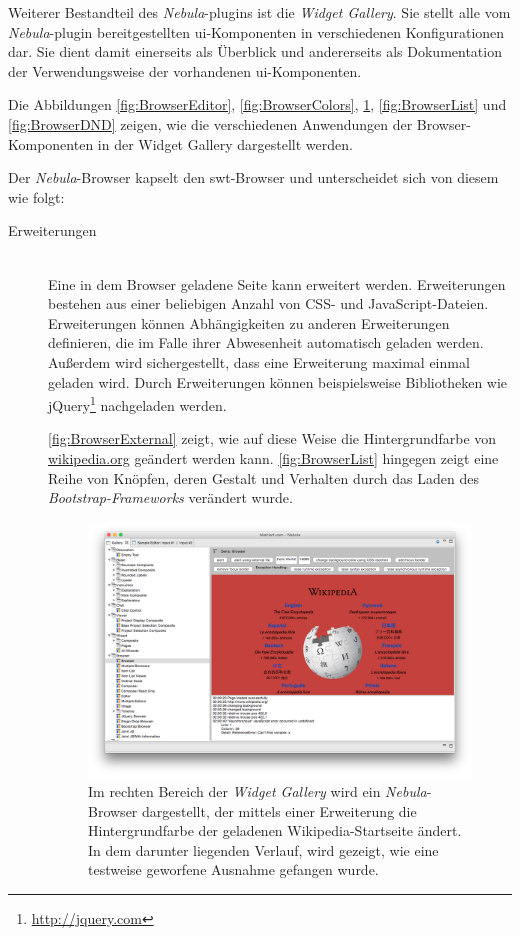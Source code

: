 Weiterer Bestandteil des \textit{Nebula}-\gls{plugin}s ist die \textit{Widget Gallery}. Sie stellt alle vom \textit{Nebula}-\gls{plugin} bereitgestellten \acrshort{ui}-Komponenten in verschiedenen Konfigurationen dar. Sie dient damit einerseits als Überblick und andererseits als Dokumentation der Verwendungsweise der vorhandenen \acrshort{ui}-Komponenten.

Die Abbildungen \ref{fig:BrowserEditor}, \ref{fig:BrowserColors}, \ref{fig:BrowserExternal}, \ref{fig:BrowserList} und \ref{fig:BrowserDND} zeigen, wie die verschiedenen Anwendungen der Browser-Komponenten in der Widget Gallery dargestellt werden.

Der \textit{Nebula}-Browser kapselt den \gls{swt}-Browser und unterscheidet sich von diesem wie folgt:

\begin{description}
  \item[Erweiterungen] \hfill \\
  Eine in dem Browser geladene Seite kann erweitert werden. Erweiterungen bestehen aus einer beliebigen Anzahl von CSS- und JavaScript-Dateien. Erweiterungen können Abhängigkeiten zu anderen Erweiterungen definieren, die im Falle ihrer Abwesenheit automatisch geladen werden. Außerdem wird sichergestellt, dass eine Erweiterung maximal einmal geladen wird. Durch Erweiterungen können beispielsweise Bibliotheken wie jQuery\footnote{\url{http://jquery.com}} nachgeladen werden. 
  
  \autoref{fig:BrowserExternal} zeigt, wie auf diese Weise die Hintergrundfarbe von \url{wikipedia.org} geändert werden kann. \autoref{fig:BrowserList} hingegen zeigt eine Reihe von Knöpfen, deren Gestalt und Verhalten durch das Laden des \textit{Bootstrap-Frameworks} verändert wurde.
  
  \begin{figure}
    \centering
      \includegraphics[width=1.0\linewidth]{Figures/browser/BrowserExternal.png}
    \caption[Nebula-Browser mit geladener Wikipedia-Startseite]{Im rechten Bereich der \textit{Widget Gallery} wird ein \textit{Nebula}-Browser dargestellt, der mittels einer Erweiterung die Hintergrundfarbe der geladenen Wikipedia-Startseite ändert. In dem darunter liegenden Verlauf, wird gezeigt, wie eine testweise geworfene Ausnahme gefangen wurde.}
    \label{fig:BrowserExternal}
  \end{figure}
  

\end{description}
